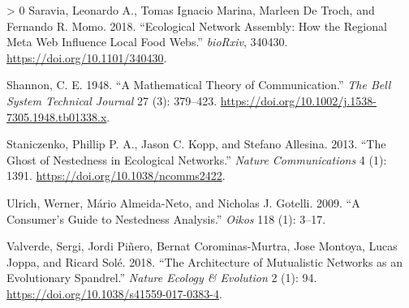 \documentclass[11pt]{article}
\newlength{\cslhangindent}
\newenvironment{CSLReferences}[3] %
 {%
  \setlength{\parindent}{0pt}
  \ifodd #1 \everypar{\setlength{\hangindent}{\cslhangindent}}\ignorespaces\fi
  \ifnum #2 > 0
  \setlength{\parskip}{#2\baselineskip}
  \fi
 }%
 {}
\begin{document}
\begin{CSLReferences}{1}{0}
\leavevmode\hypertarget{ref-Saravia2018EcoNet}{}%
Saravia, Leonardo A., Tomas Ignacio Marina, Marleen De Troch, and
Fernando R. Momo. 2018. {``Ecological Network Assembly: How the Regional
Meta Web Influence Local Food Webs.''} \emph{bioRxiv}, 340430.
\url{https://doi.org/10.1101/340430}.

\leavevmode\hypertarget{ref-Shannon1948MatThe}{}%
Shannon, C. E. 1948. {``A Mathematical Theory of Communication.''}
\emph{The Bell System Technical Journal} 27 (3): 379--423.
\url{https://doi.org/10.1002/j.1538-7305.1948.tb01338.x}.

\leavevmode\hypertarget{ref-Staniczenko2013GhoNes}{}%
Staniczenko, Phillip P. A., Jason C. Kopp, and Stefano Allesina. 2013.
{``The Ghost of Nestedness in Ecological Networks.''} \emph{Nature
Communications} 4 (1): 1391. \url{https://doi.org/10.1038/ncomms2422}.

\leavevmode\hypertarget{ref-Ulrich2009ConSG}{}%
Ulrich, Werner, Mário Almeida-Neto, and Nicholas J. Gotelli. 2009. {``A
Consumer's Guide to Nestedness Analysis.''} \emph{Oikos} 118 (1): 3--17.

\leavevmode\hypertarget{ref-Valverde2018ArcMut}{}%
Valverde, Sergi, Jordi Piñero, Bernat Corominas-Murtra, Jose Montoya,
Lucas Joppa, and Ricard Solé. 2018. {``The Architecture of Mutualistic
Networks as an Evolutionary Spandrel.''} \emph{Nature Ecology \&
Evolution} 2 (1): 94. \url{https://doi.org/10.1038/s41559-017-0383-4}.

\end{CSLReferences}
\end{document}
